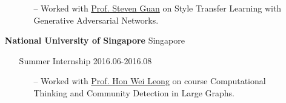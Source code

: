 \documentclass[11pt]{article}
\begin{document}
\begin{itemize}[leftmargin=0em, noitemsep, nolistsep]
\begin{itemize}[noitemsep, nolistsep, leftmargin=0em]
\begin{itemize}
                \small
                \item[--] Worked with \href{https://www.xjtlu.edu.cn/en/departments/academic-departments/computer-science-and-software-engineering/staff/steven-guan}{Prof. Steven Guan} on Style Transfer Learning with Generative Adversarial Networks.
             \end{itemize}
        \end{itemize} 
    \item[] \large\textbf{National University of Singapore} \hfill Singapore
        \begin{itemize}[noitemsep, nolistsep, leftmargin=0em]
            \item[] Summer Internship \hfill 2016.06-2016.08
            \begin{itemize}
                \small
                \item[--] Worked with \href{https://www.comp.nus.edu.sg/~leonghw/}{Prof. Hon Wei Leong} on course Computational Thinking and Community Detection in Large Graphs.
            \end{itemize}
        \end{itemize} 
\end{itemize}
\end{document}
